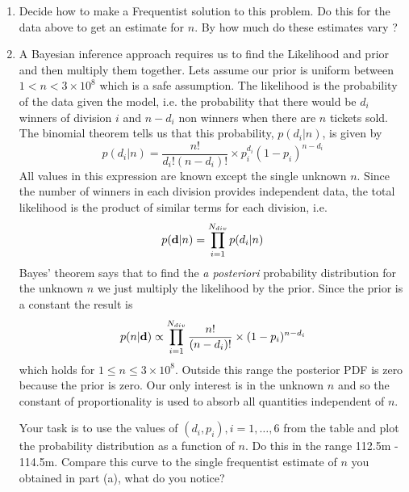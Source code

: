 \documentclass[a4paper,11pt]{article}
\begin{document}
\begin{enumerate}[resume]
\begin{enumerate}
  \item Decide how to make a Frequentist solution to this problem.
  Do this for the data above to get an estimate for $n$. By how much do these estimates vary ?
  
  \item A Bayesian inference approach requires us to find the Likelihood and prior and then multiply them together. Lets assume our prior is uniform between $1< n < 3\times 10^8$ which is a safe assumption. The likelihood is the probability of the data given the model, i.e. the probability that there would be $d_i$ winners of division $i$ and $n - d_i$ non winners when there are $n$ tickets sold. The binomial theorem tells us that this probability, $p(d_i | n)$, is given by
%
\[
p(d_i | n) = \frac{n!}{d_i! (n-d_i)!} \times p_i^{d_i} (1-p_i)^{n-d_i}
\]
%
All values in this expression are known except the single unknown $n$. Since the number of winners in each division provides independent data, the total likelihood is the product of similar terms for each division, i.e.
%
\begin{equation}
p({\bf d}| n) = \prod_{i=1}^{N_{div}} p(d_i | n)
\label{eq:like}
\end{equation}
%
Bayes' theorem says that to find the {\sl a posteriori} probability distribution for the unknown $n$ we just multiply the likelihood by the prior. Since the prior is a constant the result is
%
\[
p(n | {\bf d}) \propto  \prod_{i=1}^{N_{div}} \frac{n!}{(n-d_i)!} \times (1-p_i)^{n-d_i}
\]
%
which holds for $1 \le n \le 3\times 10^8$. Outside this range the posterior PDF is zero because the prior is zero.  Our only interest is in the unknown $n$ and so the constant of proportionality is used to absorb all quantities independent of $n$.  

Your task is to use the values of $(d_i, p_i), i=1,\dots, 6$ from the table and plot the probability distribution as a function of $n$.
Do this in the range  112.5m - 114.5m. Compare this curve to the single frequentist estimate of $n$ you obtained in part (a), what do you notice?


\end{enumerate}
\end{enumerate}
\end{document}
